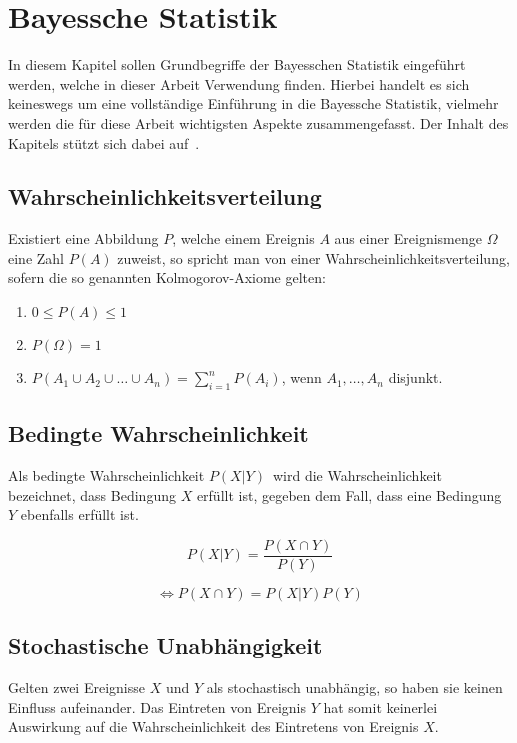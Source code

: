 \section{Bayessche Statistik}\label{sec:statistics}
    In diesem Kapitel sollen Grundbegriffe der Bayesschen Statistik eingeführt werden, welche in dieser Arbeit Verwendung finden. 
    Hierbei handelt es sich keineswegs um eine vollständige Einführung in die Bayessche Statistik, vielmehr werden die für diese Arbeit wichtigsten Aspekte zusammengefasst.
    Der Inhalt des Kapitels stützt sich dabei auf~\cite{bw_statistik}.
    
    \subsection{Wahrscheinlichkeitsverteilung}
        Existiert eine Abbildung $P$, welche einem Ereignis $A$ aus einer Ereignismenge $\Omega$ eine Zahl $P(A)$ zuweist, so spricht man von einer Wahrscheinlichkeitsverteilung, sofern die so genannten Kolmogorov-Axiome gelten:
        \begin{enumerate}
            \item $0 \le P(A) \le 1$
            \item $P(\Omega) = 1$
            \item $P(A_{1} \cup A_{2} \cup \dots \cup A_{n}) = \sum_{i=1}^{n}P(A_{i})$, wenn $A_{1}, \dots, A_{n}$ disjunkt.
        \end{enumerate}

    \subsection{Bedingte Wahrscheinlichkeit}
        Als bedingte Wahrscheinlichkeit $P(X|Y)$~wird die Wahrscheinlichkeit bezeichnet, dass Bedingung $X$ erfüllt ist, gegeben dem Fall, dass eine Bedingung $Y$ ebenfalls erfüllt ist.

        \begin{equation}
            P(X|Y) = \frac{P(X \cap Y)}{P(Y)}
            \label{eq:cond}
        \end{equation}

        \begin{equation}
            \Leftrightarrow P(X \cap Y) = P(X|Y)P(Y)
            \label{eq:cap}
        \end{equation}

    \subsection{Stochastische Unabhängigkeit}
        Gelten zwei Ereignisse $X$ und $Y$ als stochastisch unabhängig, so haben sie keinen Einfluss aufeinander.
        Das Eintreten von Ereignis $Y$ hat somit keinerlei Auswirkung auf die Wahrscheinlichkeit des Eintretens von Ereignis $X$.

